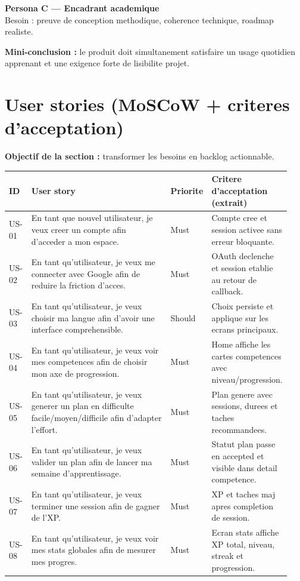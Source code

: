 \documentclass[12pt,a4paper]{article}
\begin{document}
\textbf{Persona C --- Encadrant academique}\\
Besoin : preuve de conception methodique, coherence technique, roadmap realiste.

\textbf{Mini-conclusion :} le produit doit simultanement satisfaire un usage quotidien apprenant et une exigence forte de lisibilite projet.

\section{User stories (MoSCoW + criteres d'acceptation)}
\textbf{Objectif de la section :} transformer les besoins en backlog actionnable.

\begin{longtable}{p{0.08\linewidth}p{0.52\linewidth}p{0.12\linewidth}p{0.22\linewidth}}
\toprule
\textbf{ID} & \textbf{User story} & \textbf{Priorite} & \textbf{Critere d'acceptation (extrait)} \\
\midrule
US-01 & En tant que nouvel utilisateur, je veux creer un compte afin d'acceder a mon espace. & Must & Compte cree et session activee sans erreur bloquante. \\
US-02 & En tant qu'utilisateur, je veux me connecter avec Google afin de reduire la friction d'acces. & Must & OAuth declenche et session etablie au retour de callback. \\
US-03 & En tant qu'utilisateur, je veux choisir ma langue afin d'avoir une interface comprehensible. & Should & Choix persiste et applique sur les ecrans principaux. \\
US-04 & En tant qu'utilisateur, je veux voir mes competences afin de choisir mon axe de progression. & Must & Home affiche les cartes competences avec niveau/progression. \\
US-05 & En tant qu'utilisateur, je veux generer un plan en difficulte facile/moyen/difficile afin d'adapter l'effort. & Must & Plan genere avec sessions, durees et taches recommandees. \\
US-06 & En tant qu'utilisateur, je veux valider un plan afin de lancer ma semaine d'apprentissage. & Must & Statut plan passe en accepted et visible dans detail competence. \\
US-07 & En tant qu'utilisateur, je veux terminer une session afin de gagner de l'XP. & Must & XP et taches maj apres completion de session. \\
US-08 & En tant qu'utilisateur, je veux voir mes stats globales afin de mesurer mes progres. & Must & Ecran stats affiche XP total, niveau, streak et progression. \\

\end{longtable}
\end{document}
